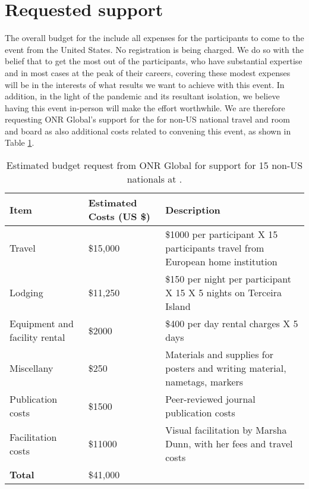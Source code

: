 \section{Requested  support}

The overall budget for the \symp include all expenses for the
participants to come to the event from the United States. No
registration is being charged. We do so with the belief that to get
the most out of the participants, who have substantial expertise and
in most cases at the peak of their careers, covering these modest
expenses will be in the interests of what results we want to achieve
with this event. In addition, in the light of the pandemic and its
resultant isolation, we believe having this event in-person will make
the effort worthwhile.  We are therefore requesting ONR Global's
support for the \symp for non-US national travel and room and board as
also additional costs related to convening this event, as shown in
Table \ref{tab:nsf-budget}.

\begin{table}[!h]
  \footnotesize{
    \centering    
    \begin{tabular}{|p{3.0cm}|p{1.6cm}|p{10cm}|}
      \hline 
      \rowcolor{Gray}
      \bfseries Item& \bfseries Estimated Costs (US \$)&\bfseries Description\\
      \hline
      Travel & \$15,000 & \$1000 per participant X 15 participants travel from European home institution \\
      \hline
      Lodging& \$11,250 & \$150 per night per participant X 15 X 5 nights on Terceira Island\\
      \hline
      Equipment and facility rental &\$2000 & \$400 per day rental charges X 5 days\\
      \hline
      Miscellany& \$250 & Materials and supplies for posters and writing material,
                          nametags, markers\\
      \hline
      Publication costs& \$1500 & Peer-reviewed journal publication
                                  costs\\
      \hline
      Facilitation costs& \$11000 & Visual facilitation by Marsha
                                    Dunn, with her fees and travel costs\\
      \hline
      \textbf{Total}& \$41,000&\\
      \hline        
  \end{tabular}
  \caption{Estimated budget request from ONR Global for support for 15
    non-US nationals at \sympe.}
  \label{tab:nsf-budget}
}
\end{table}

